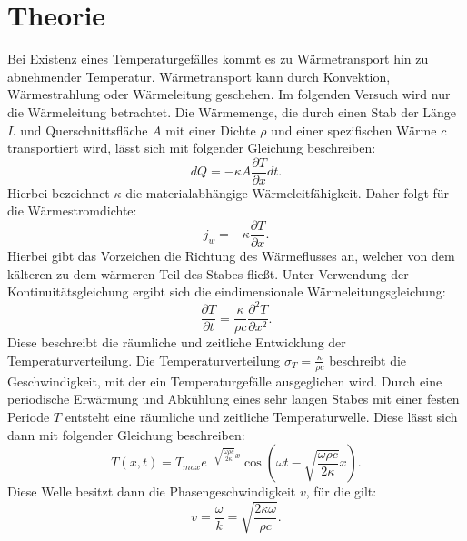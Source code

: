 \section{Theorie}
\label{sec:theorie}
Bei Existenz eines Temperaturgefälles kommt es zu Wärmetransport hin zu
abnehmender Temperatur. Wärmetransport kann durch Konvektion, Wärmestrahlung oder
Wärmeleitung geschehen. Im folgenden Versuch wird nur die Wärmeleitung betrachtet.
\noindent
Die Wärmemenge, die durch einen Stab der Länge $L$ und Querschnittsfläche $A$
mit einer Dichte $\rho$ und einer spezifischen Wärme $c$ transportiert wird,
lässt sich mit folgender Gleichung beschreiben:
\begin{equation}
  dQ = - \kappa A \frac{\partial T}{\partial x} dt.
  \label{eqn:wärmemenge}
\end{equation}
Hierbei bezeichnet $\kappa$ die materialabhängige Wärmeleitfähigkeit.
Daher folgt für die Wärmestromdichte:
\begin{equation}
  j_w = - \kappa \frac{\partial T}{\partial x}.
  \label{eqn:wärmestromdichte}
\end{equation}
Hierbei gibt das Vorzeichen die Richtung des Wärmeflusses an, welcher von dem kälteren
zu dem wärmeren Teil des Stabes fließt.
Unter Verwendung der Kontinuitätsgleichung ergibt sich die eindimensionale
Wärmeleitungsgleichung:
\begin{equation}
  \frac{\partial T}{\partial t} = \frac{\kappa}{\rho c} \frac{\partial^2 T}{\partial x^2}.
  \label{eqn:wärmeleitungsgleichung}
\end{equation}
Diese beschreibt die räumliche und zeitliche Entwicklung der Temperaturverteilung.
Die Temperaturverteilung $\sigma_T = \frac{\kappa}{\rho c}$ beschreibt die
Geschwindigkeit, mit der ein Temperaturgefälle ausgeglichen wird.
Durch eine periodische Erwärmung und Abkühlung eines sehr langen Stabes mit einer
festen Periode $T$ entsteht eine räumliche und zeitliche Temperaturwelle.
Diese lässt sich dann mit folgender Gleichung beschreiben:
\begin{equation}
  T(x,t) = T_{max} e^{-\sqrt{\frac{\omega \rho c}{2 \kappa}} x} \cos{\left(\omega t - \sqrt{\frac{\omega \rho c}{2 \kappa}} x \right)}.
  \label{eqn:temperaturwelle}
\end{equation}
Diese Welle besitzt dann die Phasengeschwindigkeit $v$, für die gilt:
\begin{equation}
  v = \frac{\omega}{k} = \sqrt{\frac{2 \kappa \omega}{\rho c}}.
  \label{eqn:phasengeschwindigkeit}
\end{equation}
